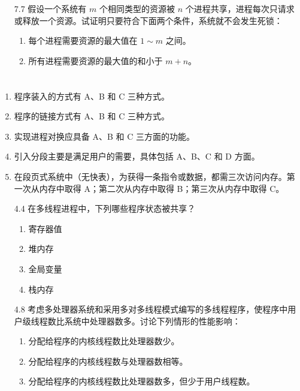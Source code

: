 \documentclass[UTF8]{ctexart}
\begin{document}
\begin{enumerate}
\begin{enumerate}
		\item[7.7] 假设一个系统有 $m$ 个相同类型的资源被 $n$ 个进程共享，进程每次只请求或释放一个资源。试证明只要符合下面两个条件，系统就不会发生死锁：
		\begin{enumerate}
			\item 每个进程需要资源的最大值在 $1 \sim m$ 之间。
			\item 所有进程需要资源的最大值的和小于 $m + n$。
		\end{enumerate}
	\end{enumerate}
\end{enumerate}

\section{}
\begin{enumerate}
	\item 程序装入的方式有 A、B 和 C 三种方式。
	
	\item 程序的链接方式有 A、B 和 C 三种方式。
	
	\item 实现进程对换应具备 A、B 和 C 三方面的功能。
	
	\item 引入分段主要是满足用户的需要，具体包括 A、B、C 和 D 方面。
	
	\item 在段页式系统中（无快表），为获得一条指令或数据，都需三次访问内存。第一次从内存中取得 A；第二次从内存中取得 B；第三次从内存中取得 C。
	
	\item[4.4] 在多线程进程中，下列哪些程序状态被共享？
	\begin{enumerate}
		\item 寄存器值
		\item 堆内存
		\item 全局变量
		\item 栈内存
	\end{enumerate}
	
	\item[4.8] 考虑多处理器系统和采用多对多线程模式编写的多线程程序，使程序中用户级线程数比系统中处理器数多。讨论下列情形的性能影响：
	\begin{enumerate}
		\item 分配给程序的内核线程数比处理器数少。
		\item 分配给程序的内核线程数与处理器数相等。
		\item 分配给程序的内核线程数比处理器数多，但少于用户线程数。
	\end{enumerate}
\end{enumerate}
\end{document}
